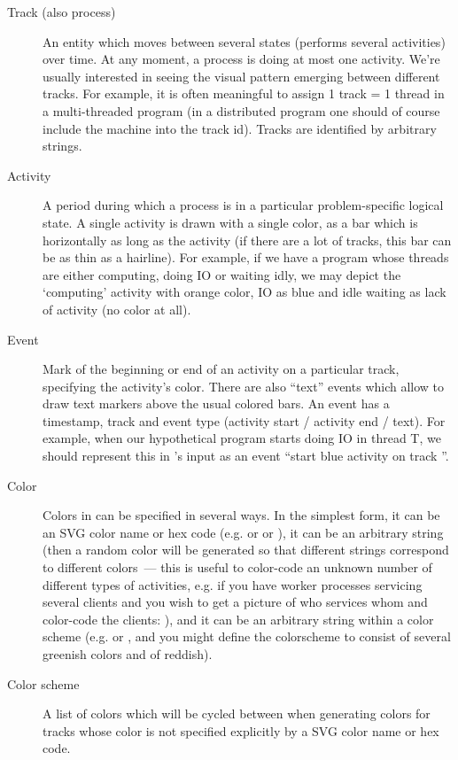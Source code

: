 \documentclass{article}
\begin{document}
\begin{description}
\item[Track (also process)] An entity which moves between several states (performs several activities) over time. At any moment, a process is doing at most one activity. We're usually interested in seeing the visual pattern emerging between different tracks. For example, it is often meaningful to assign 1 track = 1 thread in a multi-threaded program (in a distributed program one should of course include the machine into the track id). Tracks are identified by arbitrary strings.
\item[Activity] A period during which a process is in a particular problem-specific logical state. A single activity is drawn with a single color, as a bar which is horizontally as long as the activity (if there are a lot of tracks, this bar can be as thin as a hairline). For example, if we have a program whose threads are either computing, doing IO or waiting idly, we may depict the `computing' activity with orange color, IO as blue and idle waiting as lack of activity (no color at all).
\item[Event] Mark of the beginning or end of an activity on a particular track, specifying the activity's color. There are also ``text'' events which allow to draw text markers above the usual colored bars. An event has a timestamp, track and event type (activity start / activity end / text). For example, when our hypothetical program starts doing IO in thread T, we should represent this in \splot{}'s input as an event ``start blue activity on track ''.
\item[Color] Colors in \splot{} can be specified in several ways. In the simplest form, it can be an SVG color name or hex code (e.g.  or  or ), it can be an arbitrary string (then a random color will be generated so that different strings correspond to different colors~--- this is useful to color-code an unknown number of different types of activities, e.g. if you have worker processes servicing several clients and you wish to get a picture of who services whom and color-code the clients: ), and it can be an arbitrary string within a color scheme (e.g.  or , and you might define the  colorscheme to consist of several greenish colors and  of reddish).
\item[Color scheme] A list of colors which will be cycled between when generating colors for tracks whose color is not specified explicitly by a SVG color name or hex code.
\end{description}
\end{document}
